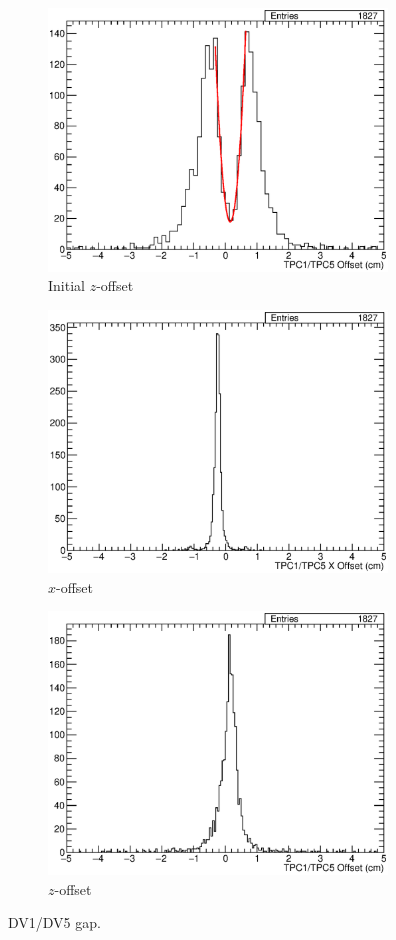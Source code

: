 \begin{figure}
  \centering
  \begin{subfigure}[t]{\linewidth}
    \centering
    \includegraphics[width=9cm]{TPC1TPC5Gap.eps}
    \caption{Initial $z$-offset}
    \label{fig:AppendixTPC1TPC5Gap}
  \end{subfigure}
  \vfill
  \begin{subfigure}[t]{\linewidth}
    \centering
    \includegraphics[width=9cm]{TPC1TPC5XOff.eps}
    \caption{$x$-offset}
    \label{fig:AppendixTPC1TPC5XOff}
  \end{subfigure}
  \vfill
  \begin{subfigure}[t]{\linewidth}
    \centering
    \includegraphics[width=9cm]{TPC1TPC5ZOff.eps}
    \caption{$z$-offset}
    \label{fig:AppendixTPC1TPC5ZOff}
  \end{subfigure}
  \caption[Demonstration of the measurements of the $x$- and $z$-offsets in the 35-ton DV1/DV5 gap.]{DV1/DV5 gap.}
  \label{fig:AppendixTPC1TPC5}
\end{figure}


